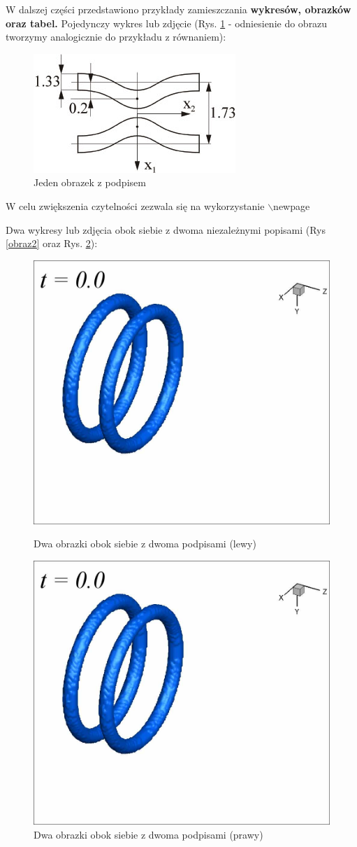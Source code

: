 \documentclass[polish,a4paper]{article}
\begin{document}
W dalszej części przedstawiono przykłady zamieszczania \textbf{wykresów, obrazków oraz tabel.}
Pojedynczy wykres lub zdjęcie (Rys. \ref{obraz1} - odniesienie do obrazu tworzymy analogicznie do przykładu z równaniem):
\begin{figure}[h!]
\centering
\includegraphics[width=0.35\linewidth]{figure1.jpg}
\caption{Jeden obrazek z podpisem}\label{obraz1}
\end{figure}

W celu zwiększenia czytelności zezwala się na wykorzystanie $\backslash$newpage
\newpage

Dwa wykresy lub zdjęcia obok siebie z dwoma niezależnymi popisami (Rys \ref{obraz2} oraz Rys. \ref{obraz3}):

\begin{figure}[htb]
\centering
\begin{minipage}[t]{0.42\linewidth}
\centering
\includegraphics[width=0.65\linewidth]{figure1a.jpg}
\caption{Dwa obrazki obok siebie z dwoma podpisami (lewy)}\label{obraz2}
\end{minipage}
\quad
\begin{minipage}[t]{0.42\linewidth}
\centering
\includegraphics[width=0.65\linewidth]{figure1a.jpg}
\caption{Dwa obrazki obok siebie z dwoma podpisami (prawy)}\label{obraz3}
\end{minipage}
\end{figure}
\end{document}
